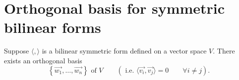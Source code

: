 \documentclass{report}
\begin{document}
 





   
         \section{Orthogonal basis for symmetric bilinear forms}
         \thm{}
         {
         Suppose $ \langle ,  \rangle $ is a bilinear symmetric form defined on a vector space $ V$. There exists an orthogonal basis 
         \[
         \left\{ \vec{ w_1}, \ldots, \vec{ w_n} \right\} \text{ of } V \qquad  \left(  \text{ i.e. } \langle \vec{ v_i} , \vec{ v_j}\rangle =0 \qquad  \forall  i \neq j  \right) 
         .\] 
         }
\end{document}
